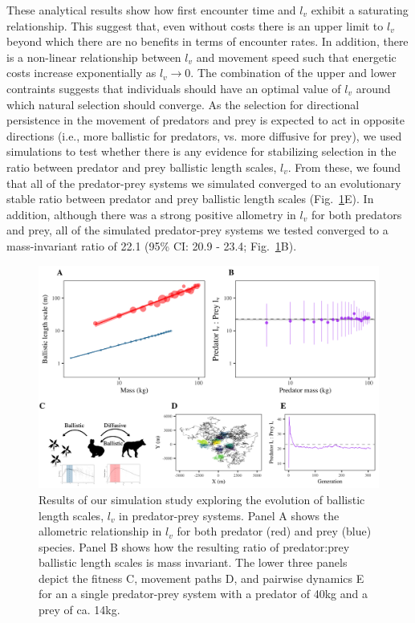 \documentclass[12pt]{article}
\begin{document}
These analytical results show how first encounter time and $l_v$ exhibit a saturating relationship. This suggest that, even without costs there is an upper limit to $l_v$ beyond which there are no benefits in terms of encounter rates.  In addition, there is a non-linear relationship between $l_v$ and movement speed such that energetic costs increase exponentially as $l_v \to 0$. The combination of the upper and lower contraints suggests that individuals should have an optimal value of $l_v$ around which natural selection should converge. As the selection for directional persistence in the movement of predators and prey is expected to act in opposite directions (i.e., more ballistic for predators, vs. more diffusive for prey), we used simulations to test whether there is any evidence for stabilizing selection in the ratio between predator and prey ballistic length scales, $l_v$. From these, we found that all of the predator-prey systems we simulated converged to an evolutionary stable ratio between predator and prey ballistic length scales (Fig.~\ref{fig:sim_res}E). In addition, although there was a strong positive allometry in $l_v$ for both predators and prey, all of the simulated predator-prey systems we tested converged to a mass-invariant ratio of 22.1 (95\% CI: 20.9 - 23.4; Fig.~\ref{fig:sim_res}B).


\begin{figure}[!h]
\centering
\includegraphics[scale=0.9]{lv_Scaling_Simulations.png}
\caption{Results of our simulation study exploring the evolution of ballistic length scales, $l_v$ in predator-prey systems. Panel A shows the allometric relationship in $l_v$ for both predator (red) and prey (blue) species. Panel B shows how the resulting ratio of predator:prey ballistic length scales is mass invariant. The lower three panels depict the fitness C, movement paths D, and pairwise dynamics E for an a single predator-prey system with a predator of 40kg and a prey of ca. 14kg.}
\label{fig:sim_res}
\end{figure}
\end{document}

